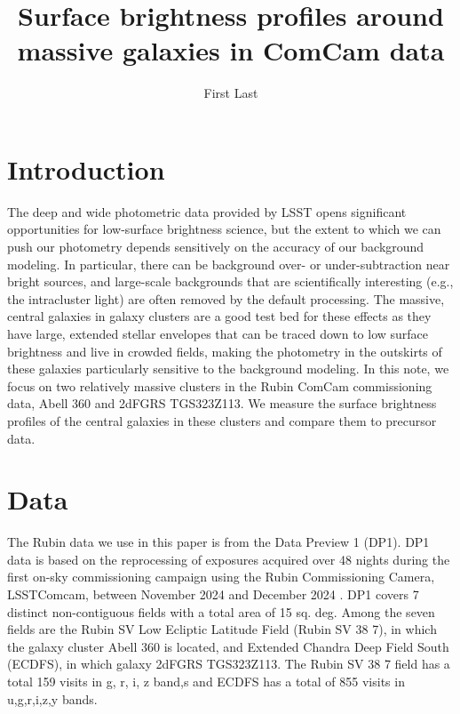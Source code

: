 \documentclass[SE,lsstdraft,authoryear,toc]{lsstdoc}
\title{Surface brightness profiles around massive galaxies in ComCam data}
\author{%
First Last
}
\date{\vcsDate}
\begin{document}
\maketitle


\section{Introduction}
The deep and wide photometric data provided by LSST opens significant opportunities for low-surface brightness science, but the extent to which we can push our photometry depends sensitively on the accuracy of our background modeling. In particular, there can be background over- or under-subtraction near bright sources, and large-scale backgrounds that are scientifically interesting (e.g., the intracluster light) are often removed by the default processing. The massive, central galaxies in galaxy clusters are a good test bed for these effects as they have large, extended stellar envelopes that can be traced down to low surface brightness and live in crowded fields, making the photometry in the outskirts of these galaxies particularly sensitive to the background modeling.
In this note, we focus on two relatively massive clusters in the Rubin ComCam commissioning data, Abell 360 and 2dFGRS TGS323Z113. We measure the surface brightness profiles of the central galaxies in these clusters and compare them to precursor data.

\section{Data}
The Rubin data we use in this paper is from the Data Preview 1 (DP1). DP1 data is based on the reprocessing of exposures acquired over 48 nights during the first on-sky commissioning campaign using the Rubin Commissioning Camera, LSSTComcam, between November 2024 and December 2024 \cite{ComCam}. DP1 covers 7 distinct non-contiguous fields with a total area of 15 sq. deg. Among the seven fields are the Rubin SV Low Ecliptic Latitude Field (Rubin SV 38 7), in which the galaxy cluster Abell 360 is located, and Extended Chandra Deep Field South (ECDFS), in which galaxy 2dFGRS TGS323Z113. The Rubin SV 38 7 field has a total 159 visits in g, r, i, z band,s and ECDFS has a total of 855 visits in u,g,r,i,z,y bands. 
\end{document}
